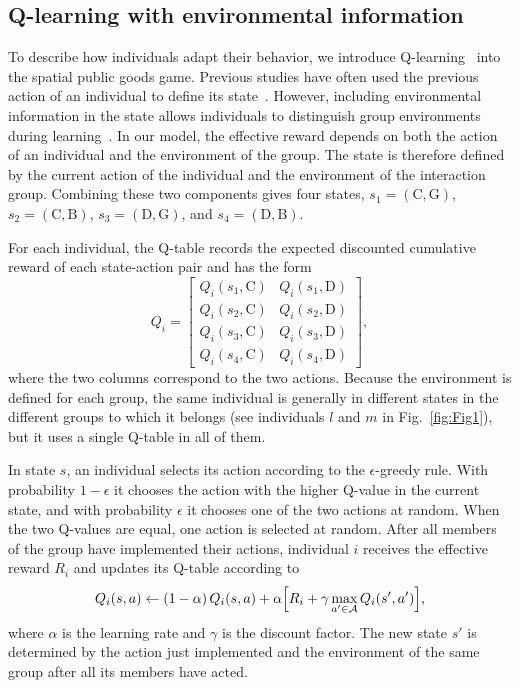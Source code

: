 \documentclass[%
  aip,cha,
  amsmath,amssymb,
  reprint,
  floatfix,
  article-title,
]{revtex4-2}
\begin{document}
\subsection{Q-learning with environmental information}\label{sec:qlearning}

To describe how individuals adapt their behavior, we introduce Q-learning~\cite{watkins1992qlearning,sutton2018reinforcement} into the spatial public goods game. Previous studies have often used the previous action of an individual to define its state~\cite{wang2022levy,fan2022incorporating,du2026shaping}. However, including environmental information in the state allows individuals to distinguish group environments during learning~\cite{li2025environmental}. In our model, the effective reward depends on both the action of an individual and the environment of the group. The state is therefore defined by the current action of the individual and the environment of the interaction group. Combining these two components gives four states, $s_1=(\mathrm{C},\mathrm{G})$, $s_2=(\mathrm{C},\mathrm{B})$, $s_3=(\mathrm{D},\mathrm{G})$, and $s_4=(\mathrm{D},\mathrm{B})$.

For each individual, the Q-table records the expected discounted cumulative reward of each state-action pair and has the form
\begin{equation}
Q_i=
\begin{bmatrix}
Q_i(s_1,\mathrm{C})&Q_i(s_1,\mathrm{D})\\
Q_i(s_2,\mathrm{C})&Q_i(s_2,\mathrm{D})\\
Q_i(s_3,\mathrm{C})&Q_i(s_3,\mathrm{D})\\
Q_i(s_4,\mathrm{C})&Q_i(s_4,\mathrm{D})
\end{bmatrix},
\label{eq:qtable}
\end{equation}
where the two columns correspond to the two actions. Because the environment is defined for each group, the same individual is generally in different states in the different groups to which it belongs (see individuals $l$ and $m$ in Fig.~\ref{fig:Fig1}), but it uses a single Q-table in all of them.

In state $s$, an individual selects its action according to the $\epsilon$-greedy rule. With probability $1-\epsilon$ it chooses the action with the higher Q-value in the current state, and with probability $\epsilon$ it chooses one of the two actions at random. When the two Q-values are equal, one action is selected at random. After all members of the group have implemented their actions, individual $i$ receives the effective reward $R_i$ and updates its Q-table according to
\begin{equation}
Q_i(s,a)\leftarrow(1-\alpha)\,Q_i(s,a)+\alpha\Bigl[R_i+\gamma\max_{a'\in\mathcal{A}}Q_i(s',a')\Bigr],
\label{eq:q-learning}
\end{equation}
where $\alpha$ is the learning rate and $\gamma$ is the discount factor. The new state $s'$ is determined by the action just implemented and the environment of the same group after all its members have acted.
\end{document}
